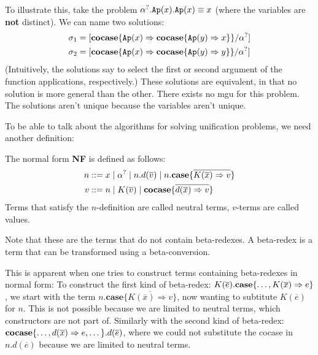 \documentclass[twoside,12pt,a4paper]{article}
\begin{document}
To illustrate this, take the problem $\alpha^?.\texttt{Ap}(x).\texttt{Ap}(x)\equiv x$ (where the variables are \textbf{not} distinct). 
We can name two solutions:
\begin{align*}
    \sigma_1 &= [\textbf{cocase}\{\texttt{Ap}(x)\Rightarrow \textbf{cocase}\{\texttt{Ap}(y)\Rightarrow x\}\}/\alpha^?]\\
    \sigma_2 &=[\textbf{cocase}\{\texttt{Ap}(x)\Rightarrow \textbf{cocase}\{\texttt{Ap}(y)\Rightarrow y\}\}/\alpha^?]  
\end{align*}
(Intuitively, the solutions say to select the first or second argument of the function applications, respectively.)
These solutions are equivalent, in that no solution is more general than the other. There exists no mgu for this problem.
The solutions aren't unique because the variables aren't unique.

To be able to talk about the algorithms for solving unification problems, we need another definition: %
\begin{definition}
    The normal form \textbf{NF} is defined as follows:
    \begin{align*}
        n &::= x \;|\; \alpha^? \;|\; n.d(\overline{v})\;|\; n.\textbf{case}\{\overline{K(\overline{x})\Rightarrow v}\}\\
        v &::= n \;|\; K(\overline{v}) \;|\; \textbf{cocase}\{\overline{d(\overline{x})\Rightarrow v}\}
    \end{align*}
    Terms that satisfy the $n$-definition are called neutral terms, $v$-terms are called values.
\end{definition}
Note that these are the terms that do not contain beta-redexes. 
A beta-redex is a term that can be transformed using a beta-conversion.

This is apparent when one tries to construct terms containing beta-redexes in normal form: 
To construct the first kind of beta-redex: $K(\overline{e}).\textbf{case}\{\dots,K(\overline{x})\Rightarrow e\}$,
we start with the term $n.\textbf{case}\{\overline{K(\overline{x})\Rightarrow v}\}$, now wanting to subtitute $K(\overline{e})$ for $n$. 
This is not possible because we are limited to neutral terms, which constructors are not part of.
Similarly with the second kind of beta-redex:
$\textbf{cocase}\{\dots,d(\overline{x}) \Rightarrow e, \dots\}.d(\overline{e})$, where we could not substitute the cocase in $n.d(\overline{e})$ because we are limited to neutral terms.
        
\end{document}
